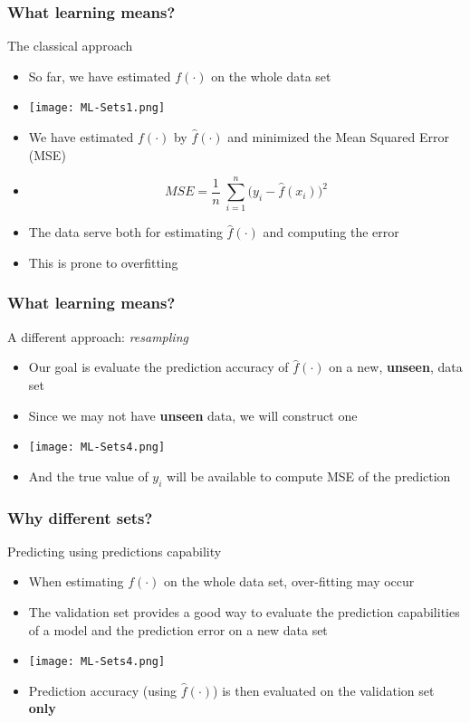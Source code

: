 \documentclass[xcolor=x11names,compress, aspectratio=169]{beamer}
\renewcommand{\(}{\begin{columns}}
\renewcommand{\)}{\end{columns}}
\newcommand{\<}[1]{\begin{column}{#1}}
\renewcommand{\>}{\end{column}}
\begin{document}
\begin{frame}
\frametitle{\textcolor{brique}{ What learning means?}}
The classical approach 
\begin{itemize}[<+->]
\item So far, we have estimated $f(\cdot)$ on the whole data set
\item[] \texttt{[image: ML-Sets1.png]}
\item[] We have estimated $f(\cdot)$ by $\widehat f(\cdot)$  and minimized the Mean Squared Error (MSE)
\item[] $$ MSE =  \frac{1}{n} \; \sum_ {i=1}^n \bigl( y_i - \widehat f(x_i) \bigr)^2 $$ 
\item The data serve both for estimating $\widehat f(\cdot)$ and computing the error
\item This is prone to overfitting
\end{itemize}
\end{frame}


\begin{frame}
\frametitle{\textcolor{brique}{ What learning means?}}
A different approach: \textit{resampling}
\begin{itemize}[<+->]
\item Our goal is  evaluate the prediction accuracy of $\widehat f(\cdot)$ on a new, \textbf{unseen}, data set 
\item Since we may not have \textbf{unseen} data, we will construct one
\item[] \texttt{[image: ML-Sets4.png]}
\item And the true value of $y_i$ will be available to compute MSE of the prediction
\end{itemize}
\end{frame}



\begin{frame}
\frametitle{\textcolor{brique}{Why different sets? }}
Predicting  using predictions capability
\begin{itemize}[<+->]
\item When estimating $f(\cdot)$ on the whole data set, over-fitting may occur
\item The validation set provides a good way to evaluate the prediction capabilities of a model and the prediction error on a new data set
\item[] \texttt{[image: ML-Sets4.png]}
\item Prediction accuracy (using $\widehat f(\cdot)$) is then evaluated on the validation set \textbf{only}
\end{itemize}
\end{frame}
\end{document}
